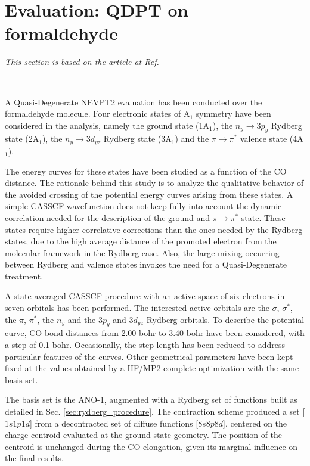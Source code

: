 \section{Evaluation: QDPT on formaldehyde}

\begin{center}
\textit{This section is based on the article at Ref. } \\
\end{center}
{\ }\\
\vspace{-5mm}

A Quasi-Degenerate NEVPT2 evaluation has been conducted over the
formaldehyde molecule. Four electronic states of A$_1$ symmetry have been
considered in the analysis, namely the ground state (1A$_1$), the $n_y \rightarrow
3p_y$ Rydberg state (2A$_1$), the $n_y \rightarrow 3d_{yz}$ Rydberg state
(3A$_1$) and the $\pi \rightarrow \pi^{*}$ valence state (4A$_1$). 

The energy curves for these states have been studied as a function of the CO
distance. The rationale behind this study is to analyze the qualitative
behavior of the avoided crossing of the potential energy curves arising from
these states.  A simple CASSCF wavefunction does not keep fully into account
the dynamic correlation needed for the description of the ground and $\pi
\rightarrow \pi^{*}$ state. These states require higher correlative
corrections than the ones needed by the Rydberg states, due to the high
average distance of the promoted electron from the molecular framework in
the Rydberg case.  Also, the large mixing occurring between Rydberg and
valence states invokes the need for a Quasi-Degenerate treatment.

A state averaged CASSCF procedure with an active space of six electrons in
seven orbitals has been performed. The interested active orbitals are the
$\sigma$, $\sigma^{*}$, the $\pi$, $\pi^{*}$, the $n_y$ and the $3p_y$ and
$3d_{yz}$ Rydberg orbitals. To describe the potential curve, CO bond
distances from 2.00 bohr to 3.40 bohr have been considered, with a step of
0.1 bohr.  Occasionally, the step length has been reduced to address
particular features of the curves. Other geometrical parameters have been
kept fixed at the values obtained by a HF/MP2 complete optimization with
the same basis set.

The basis set is the ANO-1, augmented with a Rydberg set of functions built
as detailed in Sec. \ref{sec:rydberg_procedure}. The contraction scheme
produced a set [$1s1p1d$] from a decontracted set of diffuse functions
[$8s8p8d$], centered on the charge centroid evaluated at the ground state
geometry. The position of the centroid is unchanged during the CO
elongation, given its marginal influence on the final results.

